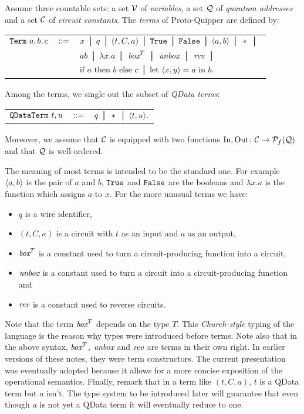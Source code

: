 \documentclass[twoside]{article}
\begin{document}
\begin{definition}
Assume three countable sets: a set $\mathcal{V}$ of \emph{variables}, a 
set $\mathcal{Q}$ of \emph{quantum addresses} and a set $\mathcal{C}$ of 
\emph{circuit constants}. The \emph{terms} of Proto-Quipper are 
defined by:
\begin{center}
\begin{tabular}{rcl}
$\texttt{Term}~a,b,c$ & $::=$ & $x \bor q \bor (t,C,a) \bor \true 
  \bor \false \bor \p{a,b} \bor * \bor$ \\[0.05in]
& & $ab \bor \lambda x.a \bor \boxx^T \bor \unbox \bor \rev 
    \bor $\\[0.05in]
& & $\ifthenelse{a}{b}{c} \bor \letin{\p{x,y}}{a}{b}.$
\end{tabular}
\end{center}
Among the terms, we single out the subset of \emph{QData terms}:
\begin{center}
\begin{tabular}{rcl}
$\texttt{QDataTerm}~t,u$ & $::=$ & $q \bor * \bor \p{t,u}.$
\end{tabular}
\end{center}
Moreover, we assume that $\mathcal{C}$ is equipped with two functions 
$\mathop{\textrm{In}}\nolimits,\mathop{\textrm{Out}}\nolimits\colon \mathcal{C}\to\mathcal{P}_f(\mathcal{Q})$ and that $\mathcal{Q}$ is 
well-ordered.
\end{definition}

The meaning of most terms is intended to be the standard 
one. For example $\langle a,b\rangle$ is the pair of $a$ and $b$, 
$\texttt{True}$ and $\texttt{False}$ are the booleans and $\lambda x.a$ 
is the function which assigns $a$ to $x$. For the more 
unusual terms we have:
\begin{itemize}
  \item $q$ is a wire identifier,
  \item $(t,C,a)$ is a circuit with $t$ as an input and $a$ as an 
        output,
  \item $\mathop{\textit{box}}\nolimits^T$ is a constant used to turn a circuit-producing 
        function into a circuit,
  \item $\mathop{\textit{unbox}}\nolimits$ is a constant used to turn a circuit into a 
        circuit-producing function and
  \item $\mathop{\textit{rev}}\nolimits$ is a constant used to reverse circuits.
\end{itemize}
Note that the term $\mathop{\textit{box}}\nolimits^T$ depends on the type $T$. This 
\emph{Church-style} typing of the language is the reason why types 
were introduced before terms. Note also that in the above syntax, 
$\mathop{\textit{box}}\nolimits^T$, $\mathop{\textit{unbox}}\nolimits$ and $\mathop{\textit{rev}}\nolimits$ are terms in their own right. In earlier 
versions of these notes, they were term constructors. The current 
presentation was eventually adopted because it allows for a more 
concise exposition of the operational semantics. Finally, remark 
that in a term like $(t,C,a)$, $t$ is a QData term but $a$ isn't. 
The type system to be introduced later will guarantee that even 
though $a$ is not yet a QData term it will eventually reduce to 
one. 
\end{document}
